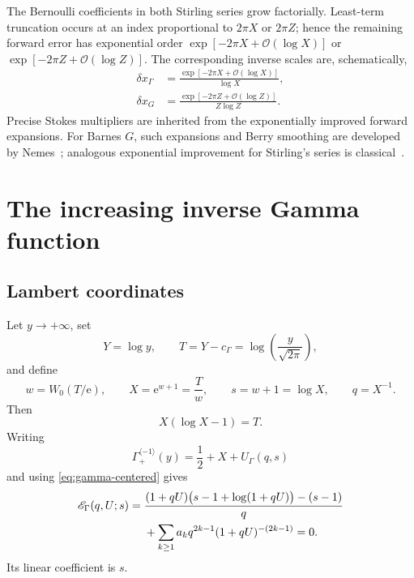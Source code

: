 \documentclass[11pt,a4paper]{article}
\numberwithin{equation}{section}
\theoremstyle{definition}
\theoremstyle{remark}
\newcommand{\e}{\mathrm e}
\newcommand{\Ord}{\mathcal O}
\newcommand{\cinv}{\langle-1\rangle}
\begin{document}
The Bernoulli coefficients in both Stirling series grow factorially.
Least-term truncation occurs at an index proportional to \(2\pi X\) or
\(2\pi Z\); hence the remaining forward error has exponential order
\(\exp[-2\pi X+\Ord(\log X)]\) or
\(\exp[-2\pi Z+\Ord(\log Z)]\).  The corresponding inverse scales are,
schematically,
\begin{align}
 \delta x_\Gamma&=
 \frac{\exp[-2\pi X+\Ord(\log X)]}{\log X},
 \label{eq:gamma-exp-scale}\\
 \delta x_G&=
 \frac{\exp[-2\pi Z+\Ord(\log Z)]}{Z\log Z}.
 \label{eq:barnes-exp-scale}
\end{align}
Precise Stokes multipliers are inherited from the exponentially improved
forward expansions.  For Barnes \(G\), such expansions and Berry smoothing
are developed by Nemes~\cite{Nemes}; analogous exponential improvement for
Stirling's series is classical~\cite{DLMFGamma,ParisKaminski}.

\section{The increasing inverse Gamma function}

\subsection{Lambert coordinates}

Let \(y\to+\infty\), set
\begin{equation}
 Y=\log y,
 \qquad T=Y-c_\Gamma=\log\!\left(\frac{y}{\sqrt{2\pi}}\right),
 \label{eq:gamma-T}
\end{equation}
and define
\begin{equation}
 w=W_0(T/\e),
 \qquad X=\e^{w+1}=\frac{T}{w},
 \qquad s=w+1=\log X,
 \qquad q=X^{-1}.
 \label{eq:gamma-coordinates}
\end{equation}
Then
\begin{equation}
 X(\log X-1)=T.
 \label{eq:gamma-leading-exact}
\end{equation}
Writing
\begin{equation}
 \Gamma_+^{\cinv}(y)=\frac12+X+U_\Gamma(q,s)
 \label{eq:gamma-U-def}
\end{equation}
and using \cref{eq:gamma-centered} gives
\begin{align}
 \mathscr E_\Gamma(q,U;s)={}&
 \frac{(1+qU)\bigl(s-1+\log(1+qU)\bigr)-(s-1)}{q}
 \notag\\
 &+\sum_{k\ge1}a_kq^{2k-1}(1+qU)^{-(2k-1)}=0.
 \label{eq:E-gamma}
\end{align}
Its linear coefficient is \(s\).
\end{document}
